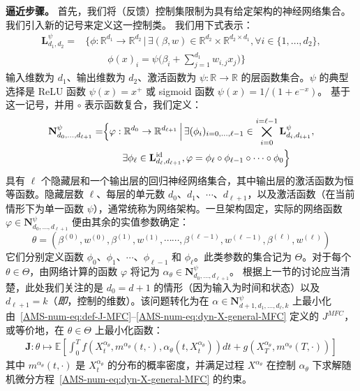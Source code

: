 \documentclass{amsproc}
\theoremstyle{definition}
\theoremstyle{remark}
\numberwithin{equation}{section}
\newcommand{\EE}{{\mathbb E}}
\newcommand{\RR}{{\mathbb R}}
\newcommand{\bJ}{{\mathbf J}}
\newcommand{\bN}{{\mathbf N}}
\newcommand{\ctrl}{\alpha}
\newcommand{\ctrldim}{k}
\begin{document}
\textbf{逼近步骤。} 首先，我们将（反馈）控制集限制为具有给定架构的神经网络集合。我们引入新的记号来定义这一控制类。
我们用下式表示：
\begin{align*}
	\mathbf{L}^\psi_{d_1, d_2} = 
	&\Big\{ \phi: \RR^{d_1} \to \RR^{d_2} \,\Big|\,  \exists (\beta, w) \in  \RR^{d_2} \times \RR^{d_2 \times d_1}, \forall  i \in \{1,\dots,d_2\}, 
	\\
	&\qquad \;\phi(x)_i = \psi\Big(\beta_i + \sum_{j=1}^{d_1} w_{i,j} x_j\Big) \Big\} 
\end{align*}
输入维数为 $d_1$、输出维数为 $d_2$、激活函数为 $\psi: \RR \to \RR$ 的层函数集合。$\psi$ 的典型选择是 ReLU 函数 $\psi(x) = x^+$ 或 sigmoid 函数 $\psi(x) = 1/(1+e^{-x})$。
基于这一记号，并用 $\circ$ 表示函数复合，我们定义：
\begin{align}
\label{eq:NNarchi-FFC}
	\bN^\psi_{d_0, \dots, d_{\ell+1}} 
	= 
	&\Big\{ \varphi: \RR^{d_0} \to \RR^{d_{\ell+1}} \,\Big|\, \exists (\phi_i)_{i=0, \dots, \ell-1} \in \bigtimes_{i=0}^{i=\ell-1} \mathbf{L}^\psi_{d_i, d_{i+1}}, 
	\\
	&\qquad \exists \phi_\ell \in \mathbf{L}^{\mathrm{id}}_{d_{\ell}, d_{\ell+1}}, \varphi = \phi_\ell \circ \phi_{\ell-1} \circ \dots \circ \phi_0  \Big\} \, 
	\notag
\end{align}
具有 $\ell$ 个隐藏层和一个输出层的回归神经网络集合，其中输出层的激活函数为恒等函数。隐藏层数 $\ell$、每层的单元数 $d_0$、$d_1$、$\cdots$、$d_{\ell+1}$，以及激活函数（在当前情形下为单一函数 $\psi$），通常统称为网络架构。一旦架构固定，实际的网络函数 $\varphi\in \bN^\psi_{d_0, \dots, d_{\ell+1}} $ 便由其余的实值参数确定：
 $$
 \theta=(\beta^{(0)}, w^{(0)},\beta^{(1)}, w^{(1)},\cdots\cdots,\beta^{(\ell-1)}, w^{(\ell-1)},\beta^{(\ell)}, w^{(\ell)})
 $$
它们分别定义函数 $\phi_0$、$\phi_1$、$\cdots$、$\phi_{\ell-1}$ 和 $\phi_\ell$。此类参数的集合记为 $\Theta$。对于每个 $\theta\in\Theta$，由网络计算的函数 $\varphi$ 将记为 $\ctrl_\theta \in \bN^\psi_{d_0, \dots, d_{\ell+1}}$。
根据上一节的讨论应当清楚，此处我们关注的是 $d_0 = d+1$ 的情形（因为输入为时间和状态）以及 $d_{\ell+1} = \ctrldim$（\textit{即}，控制的维数）。该问题转化为在 $\ctrl \in \bN^\psi_{d+1, d_1, \dots, d_{\ell}, \ctrldim} $ 上最小化由~\eqref{AMS-num-eq:def-J-MFC}--\eqref{AMS-num-eq:dyn-X-general-MFC} 定义的 $J^{MFC}$，或等价地，在 $\theta \in \Theta$ 上最小化函数：
\begin{align*}
	\bJ: \theta \mapsto \EE \left[\int_0^T f(X_t^{\ctrl_\theta}, m^{\ctrl_\theta}(t,\cdot), \ctrl_\theta(t,X_t^{\ctrl_\theta}) ) dt + g(X_T^{\ctrl_\theta}, m^{\ctrl_\theta}(T,\cdot)) \right]
\end{align*}
其中 $m^{\ctrl_\theta}(t,\cdot)$ 是 $X_t^{\ctrl_\theta}$ 的分布的概率密度，并满足过程 $X^{\ctrl_\theta}$ 在控制 $\ctrl_\theta$ 下求解随机微分方程~\eqref{AMS-num-eq:dyn-X-general-MFC} 的约束。
\end{document}
